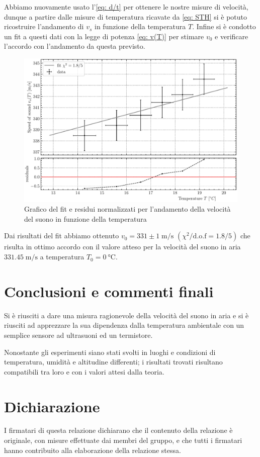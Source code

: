 \documentclass[10pt, a4paper, italian]{article}
\begin{document}
Abbiamo nuovamente usato l'\cref{eq: d/t} per ottenere le nostre misure di
velocità, dunque a partire dalle misure di temperatura ricavate da
\cref{eq: STH} si è potuto ricostruire l'andamento di $v_s$ in funzione
della temperatura $T$. Infine si è condotto un fit a questi dati con la legge
di potenza \cref{eq: v(T)} per stimare $v_0$ e verificare l'accordo con
l'andamento da questa previsto.
\begin{figure}[htbp]
    \centering
	\includegraphics[width=\textwidth]{temptime}
    \caption{Grafico del fit e residui normalizzati per l'andamento della
    velocità del suono in funzione della temperatura}
\end{figure}

Dai risultati del fit abbiamo ottenuto $v_0 = 331 \pm 1 \; \si{\m/\s}$
$(\chi^2/\text{d.o.f} = 1.8/5)$ che risulta in ottimo accordo con il
valore atteso per la velocità del suono in aria $331.45 \; \si{\m/\s}$ a
temperatura $T_0 = \SI{0}{\degreeCelsius}$. 

\section*{Conclusioni e commenti finali}
Si è riusciti a dare una misura ragionevole della velocità del suono in aria
e si è riusciti ad apprezzare la sua dipendenza dalla temperatura ambientale
con un semplice sensore ad ultrasuoni ed un termistore.

Nonostante gli esperimenti siano stati svolti in luoghi e condizioni di
temperatura, umidità e altitudine differenti; i risultati trovati risultano
compatibili tra loro e con i valori attesi dalla teoria.

\section*{Dichiarazione}
I firmatari di questa relazione dichiarano che il contenuto della relazione \`e
originale, con misure effettuate dai membri del gruppo, e che tutti i firmatari
hanno contribuito alla elaborazione della relazione stessa.
\end{document}
